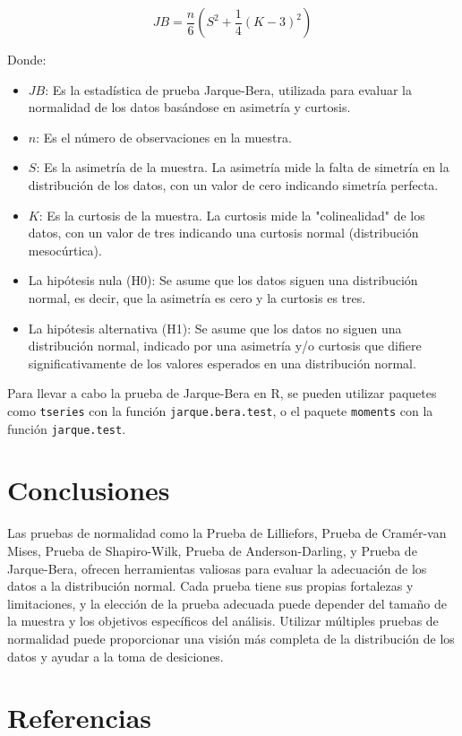\documentclass{article}
\begin{document}
\[JB = \frac{n}{6} \left(S^2 + \frac{1}{4}(K - 3)^2\right)\]

Donde:
\begin{itemize}
    \item \(JB\): Es la estadística de prueba Jarque-Bera, utilizada para evaluar la normalidad de los datos basándose en asimetría y curtosis.
    \item \(n\): Es el número de observaciones en la muestra.
    \item \(S\): Es la asimetría de la muestra. La asimetría mide la falta de simetría en la distribución de los datos, con un valor de cero indicando simetría perfecta.
    \item \(K\): Es la curtosis de la muestra. La curtosis mide la "colinealidad" de los datos, con un valor de tres indicando una curtosis normal (distribución mesocúrtica).
    \item La hipótesis nula (H0): Se asume que los datos siguen una distribución normal, es decir, que la asimetría es cero y la curtosis es tres.
    \item La hipótesis alternativa (H1): Se asume que los datos no siguen una distribución normal, indicado por una asimetría y/o curtosis que difiere significativamente de los valores esperados en una distribución normal.
\end{itemize}


Para llevar a cabo la prueba de Jarque-Bera en R, se pueden utilizar paquetes como \texttt{tseries} con la función \texttt{jarque.bera.test}, o el paquete \texttt{moments} con la función \texttt{jarque.test}.

\section{Conclusiones}

Las pruebas de normalidad como la Prueba de Lilliefors, Prueba de Cramér-van Mises, Prueba de Shapiro-Wilk, Prueba de Anderson-Darling, y Prueba de Jarque-Bera, ofrecen herramientas valiosas para evaluar la adecuación de los datos a la distribución normal. Cada prueba tiene sus propias fortalezas y limitaciones, y la elección de la prueba adecuada puede depender del tamaño de la muestra y los objetivos específicos del análisis. Utilizar múltiples pruebas de normalidad puede proporcionar una visión más completa de la distribución de los datos y ayudar a la toma de desiciones.

\newpage

\section{Referencias}
\end{document}
